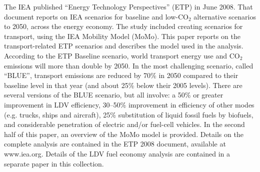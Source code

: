 The IEA published “Energy Technology Perspectives” (ETP) in June 2008. That document reports on IEA scenarios for baseline and low-CO$_2$ alternative scenarios to 2050, across the energy economy. The study included creating scenarios for transport, using the IEA Mobility Model (MoMo). This paper reports on the transport-related ETP scenarios and describes the model used in the analysis. According to the ETP Baseline scenario, world transport energy use and CO$_2$ emissions will more than double by 2050. In the most challenging scenario, called “BLUE”, transport emissions are reduced by 70\% in 2050 compared to their baseline level in that year (and about 25\% below their 2005 levels). There are several versions of the BLUE scenario, but all involve: a 50\% or greater improvement in LDV efficiency, 30–50\% improvement in efficiency of other modes (e.g. trucks, ships and aircraft), 25\% substitution of liquid fossil fuels by biofuels, and considerable penetration of electric and/or fuel-cell vehicles. In the second half of this paper, an overview of the MoMo model is provided. Details on the complete analysis are contained in the ETP 2008 document, available at www.iea.org. Details of the LDV fuel economy analysis are contained in a separate paper in this collection.
